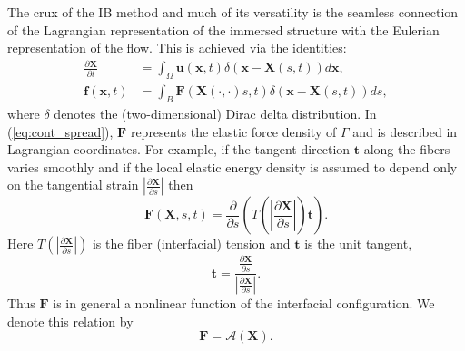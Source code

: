\documentclass[preprint,12pt]{elsarticle}
\begin{document}
The crux of the IB method and much of its versatility is the seamless connection of the Lagrangian representation of the immersed structure with the Eulerian representation of the flow. This is achieved via the identities:
\begin{align}
\frac{\partial \mathbf{X}}{\partial t}  &= \int_{\Omega} \mathbf{u}(\mathbf{x},t)\delta(\mathbf{x}-\mathbf{X}(s,t)) d \mathbf{x}, \label{eq:cont_interp} \\
\mathbf{f}(\mathbf{x},t) &= \int_{B} \mathbf{F}(\mathbf{X}(\cdot,\cdot)s,t)\delta(\mathbf{x}-\mathbf{X}(s,t)) ds
\label{eq:cont_spread},
\end{align}
where $\delta$ denotes the (two-dimensional) Dirac delta distribution. In (\ref{eq:cont_spread}), $\mathbf{F}$
represents the elastic force density of $\Gamma$ and is described in Lagrangian coordinates.  For example, 
if the tangent direction $\mathbf{t}$ along the fibers varies smoothly and if the local elastic energy density is assumed to depend only on the tangential strain $|\frac{\partial\mathbf{X}}{\partial s}|$ then
\begin{equation}
\mathbf{F}(\mathbf{X},s,t) = \frac{ \partial }{\partial s} \left(T\left(\left|\frac{\partial\mathbf{X}}{\partial s}\right|\right) \mathbf{t}\right).
\end{equation}
Here $T(|\frac{\partial\mathbf{X}}{\partial s}|)$ is the fiber (interfacial) tension and $\mathbf{t}$ is the unit tangent,
\begin{equation}
\mathbf{t} =\frac{\frac{\partial\mathbf{X}}{\partial s}}{\left|\frac{\partial\mathbf{X}}{\partial s}\right|}.
\end{equation}
Thus $\mathbf{F}$ is in general a nonlinear function of the interfacial configuration. We denote this relation by
\begin{equation}
\mathbf{F} = \mathcal{A}(\mathbf{X}).
\end{equation}
\end{document}
